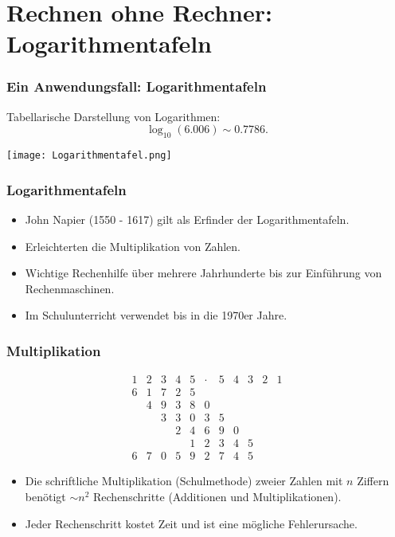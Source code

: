 \section{Rechnen ohne Rechner: Logarithmentafeln}
%
\begin{frame}\frametitle{Ein Anwendungsfall: Logarithmentafeln}

	Tabellarische Darstellung von Logarithmen: 
	$$
		\log_{10}(6.006) \sim 0.7786.
	$$

	\texttt{[image: Logarithmentafel.png]}

\end{frame}
%
%
\begin{frame}\frametitle{Logarithmentafeln}

	\begin{itemize}
		\item John Napier (1550 - 1617) gilt als Erfinder der Logarithmentafeln.
		\item Erleichterten die Multiplikation von Zahlen.
		\item Wichtige Rechenhilfe über mehrere Jahrhunderte bis zur Einführung von Rechenmaschinen.
		\item Im Schulunterricht verwendet bis in die 1970er Jahre.
	\end{itemize}

\end{frame}
%
%
\begin{frame}\frametitle{Multiplikation}
	
	$$
		\begin{array}{ccccccccccc}
 			1	&2	&3	&4	&5	&\cdot	&5	&4	&3	&2	&1	\\\hline
 			6	&1	&7	&2	&5								\\
   				& 4	&9	&3	&8	&0							\\
   				&    	&3	&3	&0	&3	&5						\\
   				&    	&   	&2	&4	&6	&9	&0					\\
   				&    	&   	&  	&1	&2	&3	&4	&5				\\\hline
   			6	&7	&0	&5	&9	&2	&7	&4	&5
		\end{array}
	$$
	
	\vfill
	\begin{itemize}
		\item Die schriftliche Multiplikation (Schulmethode) zweier Zahlen mit $n$ Ziffern benötigt $\sim n^2$ Rechenschritte 
		(Additionen und Multiplikationen). 
		\item Jeder Rechenschritt kostet Zeit und ist eine mögliche Fehlerursache.
	\end{itemize}
\end{frame}
